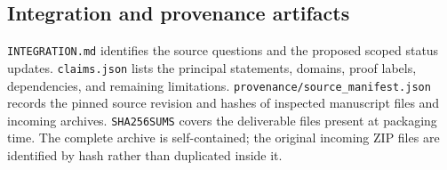\documentclass[11pt,a4paper]{article}
\numberwithin{equation}{section}
\theoremstyle{definition}
\theoremstyle{remark}
\begin{document}


\subsection{Integration and provenance artifacts}

\texttt{INTEGRATION.md} identifies the source questions and the
proposed scoped status updates. \texttt{claims.json} lists the
principal statements, domains, proof labels, dependencies, and
remaining limitations. \texttt{provenance/source\_manifest.json}
records the pinned source revision and hashes of inspected
manuscript files and incoming archives.
\texttt{SHA256SUMS} covers the deliverable files present at
packaging time. The complete archive is self-contained; the
original incoming ZIP files are identified by hash rather than
duplicated inside it.


\end{document}
